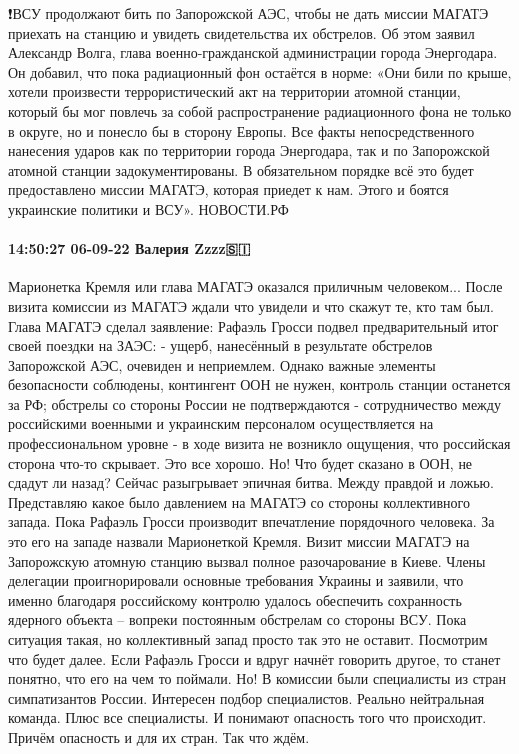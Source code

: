 ❗️ВСУ продолжают бить по Запорожской АЭС, чтобы не дать миссии МАГАТЭ приехать на станцию и увидеть свидетельства их обстрелов.
Об этом заявил Александр Волга, глава военно-гражданской администрации города Энергодара. Он добавил, что пока радиационный фон остаётся в норме:
«Они били по крыше, хотели произвести террористический акт на территории атомной станции, который бы мог повлечь за собой распространение радиационного фона не только в округе, но и понесло бы в сторону Европы.
Все факты непосредственного нанесения ударов как по территории города Энергодара, так и по Запорожской атомной станции задокументированы. В обязательном порядке всё это будет предоставлено миссии МАГАТЭ, которая приедет к нам. Этого и боятся украинские политики и ВСУ».
НОВОСТИ.РФ


\paragraph{14:50:27 06-09-22 Валерия Zzzz🇸🇮}

Марионетка Кремля или глава МАГАТЭ оказался приличным человеком...
После визита комиссии из МАГАТЭ ждали что увидели и что скажут те, кто там был.
Глава МАГАТЭ сделал заявление:
Рафаэль Гросси подвел предварительный итог своей поездки на ЗАЭС:
- ущерб, нанесённый в результате обстрелов Запорожской АЭС, очевиден и неприемлем. Однако важные элементы безопасности соблюдены, контингент ООН не нужен, контроль станции останется за РФ; обстрелы со стороны России не подтверждаются
- сотрудничество между российскими военными и украинским персоналом осуществляется на профессиональном уровне
- в ходе визита не возникло ощущения, что российская сторона что-то скрывает.
Это все хорошо. Но!
Что будет сказано в ООН, не сдадут ли назад?
Сейчас разыгрывает эпичная битва. Между правдой и ложью.
Представляю какое было давлением на МАГАТЭ со стороны коллективного запада.
Пока Рафаэль Гросси производит впечатление порядочного человека. За это его на западе назвали Марионеткой Кремля.
Визит миссии МАГАТЭ на Запорожскую атомную станцию вызвал полное разочарование в Киеве. Члены делегации проигнорировали основные требования Украины и заявили, что именно благодаря российскому контролю удалось обеспечить сохранность ядерного объекта – вопреки постоянным обстрелам со стороны ВСУ.
Пока ситуация такая, но коллективный запад просто так это не оставит.
Посмотрим что будет далее. Если Рафаэль Гросси и вдруг начнёт говорить другое, то станет понятно, что его на чем то поймали.
Но!
В комиссии были специалисты из стран симпатизантов России. Интересен подбор специалистов. Реально нейтральная команда. Плюс все специалисты. И понимают опасность того что происходит. Причём опасность и для их стран.
Так что ждём.


